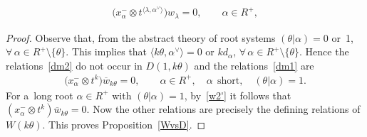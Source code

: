 \documentclass[10pt,a4paper]{amsart}
\begin{document}
\begin{gather}
\label{w2'}
\big(x^{-}_\alpha \otimes t^{\langle \lambda,
\alpha^{\vee} \rangle}\big)  w_\lambda=0,
\qquad
\alpha \in R^{+},
\end{gather}

\begin{proof}
Observe that, from the abstract theory of root systems $(\theta|\alpha)= 0$ or~1,
$\forall\, \alpha \in R^{+}\setminus \{\theta\}$.
This implies that $\langle k\theta, \alpha^{\vee}\rangle = 0$ or $kd_{\alpha}$, $\forall\, \alpha \in R^{+}\setminus \{\theta\}$.
Hence the relations~\eqref{dm2} do not occur in $D(1,k\theta)$ and the relations~\eqref{dm1} are
\begin{gather*}
\big(x^{-}_{\alpha} \otimes t^k\big) \overline{w}_{k\theta}=0,
\qquad
\alpha\in R^+,
\quad
\alpha~~\text{short},
\quad
(\theta|\alpha)=1.
\end{gather*}
For a~long root $\alpha\in R^+$ with $(\theta|\alpha)=1$, by~\eqref{w2'} it follows that $(x^{-}_{\alpha} \otimes t^k) \overline{w}_{k\theta}=0$.
Now the other relations are precisely the def\/ining relations of $W(k\theta)$. This proves Proposition~\ref{WvsD}.
\end{proof}
\end{document}

